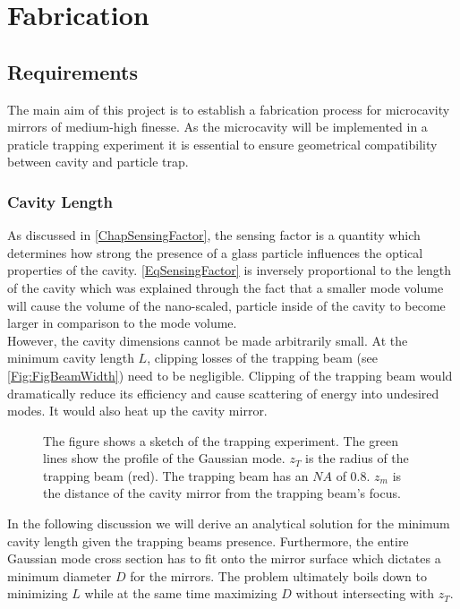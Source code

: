 \chapter{Fabrication}
\section{Requirements}
The main aim of this project is to establish a fabrication process for microcavity mirrors of medium-high finesse. As the microcavity will be implemented in a praticle trapping experiment it is essential to ensure geometrical compatibility between cavity and particle trap.

\subsection{Cavity Length}\label{ChapCavityLength}
As discussed in \autoref{ChapSensingFactor}, the sensing factor is a quantity which determines how strong the presence of a glass particle influences the optical properties of the cavity. \autoref{EqSensingFactor} is inversely proportional to the length of the cavity which was explained through the fact that a smaller mode volume will cause the volume of the nano-scaled, particle inside of the cavity to become larger in comparison to the mode volume.\\
However, the cavity dimensions cannot be made arbitrarily small. At the minimum cavity length $L$, clipping losses of the trapping beam (see \autoref{Fig:FigBeamWidth}) need to be negligible. Clipping of the trapping beam would dramatically reduce its efficiency and cause scattering of energy into undesired modes. It would also heat up the cavity mirror.\\
\begin{figure}[H]
	
	\caption{The figure shows a sketch of the trapping experiment. The green lines show the profile of the Gaussian mode. $z_{\si{T}}$ is the radius of the trapping beam (red). The trapping beam has an $\si{NA}$ of $0.8$. $z_{\si{m}}$ is the distance of the cavity mirror from the trapping beam's focus.}
	\label{Fig:FigBeamWidth}
\end{figure}
In the following discussion we will derive an analytical solution for the minimum cavity length given the trapping beams presence. Furthermore, the entire Gaussian mode cross section has to fit onto the mirror surface which dictates a minimum diameter $D$ for the mirrors. The problem ultimately boils down to minimizing $L$ while at the same time maximizing $D$ without intersecting with $z_{\si{T}}$.\\
